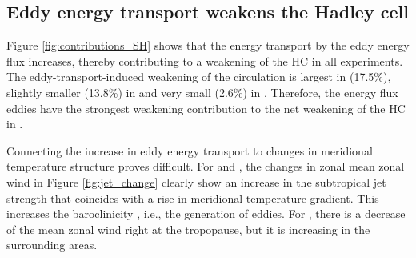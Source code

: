 \subsection{Eddy energy transport weakens the Hadley cell}

Figure \ref{fig:contributions_SH} shows that the energy transport by the eddy energy flux increases, thereby contributing to a weakening of the HC in all experiments. The eddy-transport-induced weakening of the circulation is largest in \uniform (17.5\%), slightly smaller (13.8\%) in \tropo and very small (2.6\%) in \strato. Therefore, the energy flux eddies have the strongest weakening contribution to the net weakening of the HC in \uniform.

Connecting the increase in eddy energy transport to changes in meridional temperature structure proves difficult. For \uniform and \tropo, the changes in zonal mean zonal wind in Figure \ref{fig:jet_change} clearly show an increase in the subtropical jet strength that coincides with a rise in meridional temperature gradient. This increases the baroclinicity , i.e., the generation of eddies. For \strato, there is a decrease of the mean zonal wind right at the tropopause, but it is increasing in the surrounding areas. 


